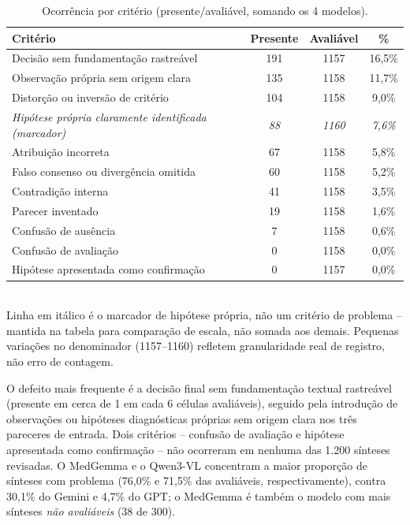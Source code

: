 \begin{table}[H]
	\centering
	\caption{Ocorrência por critério (presente/avaliável, somando os 4 modelos).}
	\label{tab:qualitativa_criterio}
	\begin{tabular}{lccc}
		\hline
		\textbf{Critério} & \textbf{Presente} & \textbf{Avaliável} & \textbf{\%} \\
		\hline
		Decisão sem fundamentação rastreável & 191 & 1157 & 16,5\% \\
		Observação própria sem origem clara & 135 & 1158 & 11,7\% \\
		Distorção ou inversão de critério & 104 & 1158 & 9,0\% \\
		\textit{Hipótese própria claramente identificada (marcador)} & \textit{88} & \textit{1160} & \textit{7,6\%} \\
		Atribuição incorreta & 67 & 1158 & 5,8\% \\
		Falso consenso ou divergência omitida & 60 & 1158 & 5,2\% \\
		Contradição interna & 41 & 1158 & 3,5\% \\
		Parecer inventado & 19 & 1158 & 1,6\% \\
		Confusão de ausência & 7 & 1158 & 0,6\% \\
		Confusão de avaliação & 0 & 1158 & 0,0\% \\
		Hipótese apresentada como confirmação & 0 & 1157 & 0,0\% \\
		\hline
	\end{tabular}
	\\ \footnotesize Linha em itálico é o marcador de hipótese própria, não um critério de problema -- mantida na tabela para comparação de escala, não somada aos demais. Pequenas variações no denominador (1157--1160) refletem granularidade real de registro, não erro de contagem.
\end{table}

O defeito mais frequente é a decisão final sem fundamentação textual rastreável (presente em cerca de 1 em cada 6 células avaliáveis), seguido pela introdução de observações ou hipóteses diagnósticas próprias sem origem clara nos três pareceres de entrada. Dois critérios -- confusão de avaliação e hipótese apresentada como confirmação -- não ocorreram em nenhuma das 1.200 sínteses revisadas. O MedGemma e o Qwen3-VL concentram a maior proporção de sínteses com problema (76,0\% e 71,5\% das avaliáveis, respectivamente), contra 30,1\% do Gemini e 4,7\% do GPT; o MedGemma é também o modelo com mais sínteses \textit{não avaliáveis} (38 de 300).


